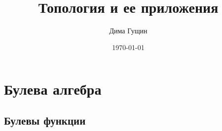 \documentclass[12pt, oneside]{book}
\author{Дима Гущин}
\title{Топология и ее приложения}
\date{\today}
\begin{document}
	
	
		
	
		
	
	\chapter{Булева алгебра} 
		\section{Булевы функции}
%		
%		
		
%		
		
		
	\titlespacing*{\chapter}{0pt}{0pt}{40pt}
	
\end{document}
